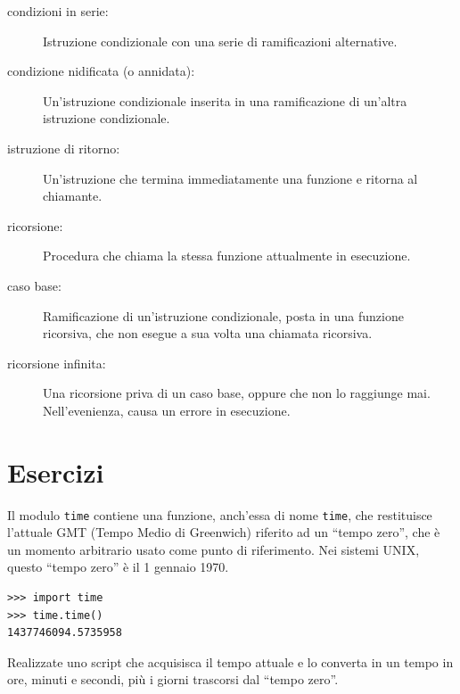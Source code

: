 \documentclass[10pt]{book}
\begin{document}
\begin{description}
\item[condizioni in serie:]  Istruzione condizionale con una serie di ramificazioni alternative.

\item[condizione nidificata (o annidata):]  Un'istruzione condizionale inserita in una ramificazione di un'altra istruzione condizionale.

\item[istruzione di ritorno:] Un'istruzione che termina immediatamente una funzione e ritorna al chiamante.

\item[ricorsione:]  Procedura che chiama la stessa funzione attualmente in esecuzione.

\item[caso base:]  Ramificazione di un'istruzione condizionale, posta in una    funzione ricorsiva, che non esegue a sua volta una chiamata ricorsiva.

\item[ricorsione infinita:]  Una ricorsione priva di un caso base, oppure che non lo raggiunge mai. Nell'evenienza, causa un errore in esecuzione.

\end{description}

\section{Esercizi}

\begin{exercise}

Il modulo {\tt time} contiene una funzione, anch'essa di nome {\tt time}, che restituisce l'attuale GMT (Tempo Medio di Greenwich) riferito ad un ``tempo zero'', che è un momento arbitrario usato come punto di riferimento. Nei sistemi UNIX, questo ``tempo zero'' è il 1 gennaio 1970.

\begin{verbatim}
>>> import time
>>> time.time()
1437746094.5735958
\end{verbatim}

Realizzate uno script che acquisisca il tempo attuale e lo converta in un tempo in ore, minuti e secondi, più i giorni trascorsi dal ``tempo zero''.

\end{exercise}
\end{document}
